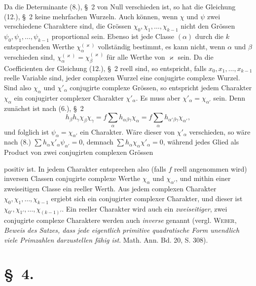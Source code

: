 \documentclass[11pt]{article}
\begin{document}
Da die Determinante (8.), \S~2 von Null verschieden ist, so hat die Gleichung (12.), \S~2 keine mehrfachen Wurzeln. Auch können, wenn $\chi$ und $\psi$ zwei verschiedene Charaktere sind, die Grössen $\chi_0,\chi_1,\ldots,\chi_{k-1}$ nicht den Grössen $\psi_0,\psi_1,\ldots,\psi_{k-1}$ proportional sein. Ebenso ist jede Classe $(\alpha)$ durch die $k$ entsprechenden Werthe $\chi_\alpha^{(\varkappa)}$ vollständig bestimmt, es kann nicht, wenn $\alpha$ und $\beta$ verschieden sind, $\chi_\alpha^{(\varkappa)}=\chi_\beta^{(\varkappa)}$ für alle Werthe von $\varkappa$ sein. Da die Coefficienten der Gleichung (12.), \S~2 reell sind, so entspricht, falls $x_0,x_1,\ldots,x_{k-1}$ reelle Variable sind, jeder complexen Wurzel eine conjugirte complexe Wurzel. Sind also $\chi_\alpha$ und $\chi'_{\alpha}$ conjugirte complexe Grössen, so entspricht jedem Charakter $\chi_\alpha$ ein conjugirter complexer Charakter $\chi'_{\alpha}$. Es muss aber $\chi'_{\alpha}=\chi_{\alpha'}$ sein. Denn zunächst ist nach (6.), \S~2
\[
h_\beta h_\gamma\chi_\beta\chi_\gamma=f\sum_\alpha h_{\alpha\beta\gamma}\chi_\alpha=f\sum_\alpha h_{\alpha'\beta\gamma}\chi_{\alpha'},
\]
und folglich ist $\psi_\alpha=\chi_{\alpha'}$ ein Charakter. Wäre dieser von $\chi'_\alpha$ verschieden, so wäre nach (8.) $\sum h_\alpha\chi'_{\alpha}\psi_{\alpha'}=0$, demnach $\sum h_\alpha\chi_\alpha\chi'_{\alpha}=0$, während jedes Glied als Product von zwei conjugirten complexen Grössen


positiv ist. In jedem Charakter entsprechen also (falls $f$ reell angenommen wird) inversen Classen conjugirte complexe Werthe $\chi_\alpha$ und $\chi_{\alpha'}$, und mithin einer zweiseitigen Classe ein reeller Werth. Aus jedem complexen Charakter $\chi_0,\chi_1,\ldots,\chi_{k-1}$ ergiebt sich ein conjugirter complexer Charakter, und dieser ist $\chi_{0'},\chi_{1'},\ldots,\chi_{(k-1)'}$. Ein reeller Charakter wird auch ein \emph{zweiseitiger}, zwei conjugirte complexe Charaktere werden auch \emph{inverse} genannt (vergl. \textsc{Weber}, \emph{Beweis des Satzes, dass jede eigentlich primitive quadratische Form unendlich viele Primzahlen darzustellen fähig ist}. Math. Ann. Bd. 20, S. 308).

\section*{\S~4.}
\end{document}
